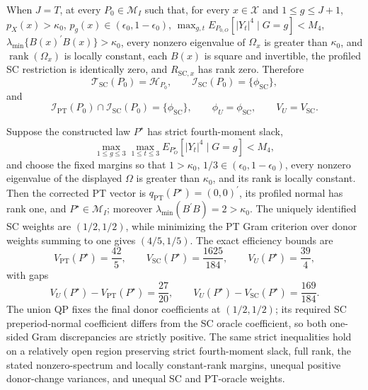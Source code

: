 When \(J=T\), at every \(P_0\in\mathcal M_I\) such that, for every \(x\in\mathcal X\) and \(1\le g\le J+1\), \(p_X(x)>\kappa_0\), \(p_g(x)\in(\epsilon_0,1-\epsilon_0)\), \(\max_{g,t}E_{P_{0,O}}[|Y_t|^4\mid G=g]<M_4\), \(\lambda_{\min}\{B(x)^{\prime}B(x)\}>\kappa_0\), every nonzero eigenvalue of \(\Omega_x\) is greater than \(\kappa_0\), and \(\operatorname{rank}(\Omega_x)\) is locally constant, each \(B(x)\) is square and invertible, the profiled SC restriction is identically zero, and \(R_{\mathrm{SC},x}\) has rank zero. Therefore
\[
\mathcal T_{\mathrm{SC}}(P_0)=\mathcal H_{P_0},
\qquad
\mathcal I_{\mathrm{SC}}(P_0)=\{\phi_{\mathrm{SC}}\},
\]
and
\[
\mathcal I_{\mathrm{PT}}(P_0)\cap\mathcal I_{\mathrm{SC}}(P_0)=\{\phi_{\mathrm{SC}}\},
\qquad
\phi_U=\phi_{\mathrm{SC}},
\qquad
V_U=V_{\mathrm{SC}}.
\]

Suppose the constructed law \(P^{\star}\) has strict fourth-moment slack,
\[
\max_{1\le g\le3}\max_{1\le t\le3}E_{P_O^{\star}}[|Y_t|^4\mid G=g]<M_4,
\]
and choose the fixed margins so that \(1>\kappa_0\), \(1/3\in(\epsilon_0,1-\epsilon_0)\), every nonzero eigenvalue of the displayed \(\Omega\) is greater than \(\kappa_0\), and its rank is locally constant. Then the corrected PT vector is \(q_{\mathrm{PT}}(P^{\star})=(0,0)^{\prime}\), its profiled normal has rank one, and \(P^{\star}\in\mathcal M_I\); moreover \(\lambda_{\min}(B^{\prime}B)=2>\kappa_0\). The uniquely identified SC weights are \((1/2,1/2)\), while minimizing the PT Gram criterion over donor weights summing to one gives \((4/5,1/5)\). The exact efficiency bounds are
\[
V_{\mathrm{PT}}(P^{\star})=\frac{42}{5},
\qquad
V_{\mathrm{SC}}(P^{\star})=\frac{1625}{184},
\qquad
V_U(P^{\star})=\frac{39}{4},
\]
with gaps
\[
V_U(P^{\star})-V_{\mathrm{PT}}(P^{\star})=\frac{27}{20},
\qquad
V_U(P^{\star})-V_{\mathrm{SC}}(P^{\star})=\frac{169}{184}.
\]
The union QP fixes the final donor coefficients at \((1/2,1/2)\); its required SC preperiod-normal coefficient differs from the SC oracle coefficient, so both one-sided Gram discrepancies are strictly positive. The same strict inequalities hold on a relatively open region preserving strict fourth-moment slack, full rank, the stated nonzero-spectrum and locally constant-rank margins, unequal positive donor-change variances, and unequal SC and PT-oracle weights.

